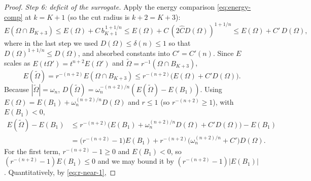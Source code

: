 \documentclass[11pt]{amsart}
\theoremstyle{definition}
\newcommand{\Om}{\Omega}
\newcommand{\abs}[1]{\left|#1\right|}
\newcommand{\Otilde}{\widetilde{\Omega}}
\begin{document}
\begin{proof}
\smallskip
\emph{Step 6: deficit of the surrogate.}
Apply the energy comparison \eqref{eq:energy-comp} at $k=K+1$ (so the
cut radius is $k+2=K+3$):
\[
   E(\Om\cap B_{K+3})\le E(\Om)+C\,b_{K+1}^{\,1+1/n}
   \le E(\Om)+C\,(2\widehat C D(\Om))^{1+1/n}
   \le E(\Om)+C'\,D(\Om),
\]
where in the last step we used $D(\Om)\le\delta(n)\le1$ so that
$D(\Om)^{1+1/n}\le D(\Om)$, and absorbed constants into
$C'=C'(n)$.
Since $E$ scales as
$E(t\Omega')=t^{n+2}E(\Omega')$ and $\Otilde=r^{-1}(\Om\cap B_{K+3})$,
\[
   E(\Otilde)=r^{-(n+2)}E(\Om\cap B_{K+3})
   \le r^{-(n+2)}\bigl(E(\Om)+C'D(\Om)\bigr).
\]
Because $\abs{\Otilde}=\omega_n$,
$D(\Otilde)=\omega_n^{-(n+2)/n}(E(\Otilde)-E(B_1))$. Using
$E(\Om)=E(B_1)+\omega_n^{(n+2)/n}D(\Om)$ and $r\le1$ (so
$r^{-(n+2)}\ge1$), with $E(B_1)<0$,
\begin{align*}
   E(\Otilde)-E(B_1)
   &\le r^{-(n+2)}\bigl(E(B_1)+\omega_n^{(n+2)/n}D(\Om)+C'D(\Om)\bigr)-E(B_1)\\
   &=\bigl(r^{-(n+2)}-1\bigr)E(B_1)
     +r^{-(n+2)}\bigl(\omega_n^{(n+2)/n}+C'\bigr)D(\Om).
\end{align*}
For the first term, $r^{-(n+2)}-1\ge0$ and $E(B_1)<0$, so
$(r^{-(n+2)}-1)E(B_1)\le0$ and we may bound it by
$(r^{-(n+2)}-1)|E(B_1)|$.
Quantitatively, by \eqref{eq:r-near-1},

\end{proof}
\end{document}
